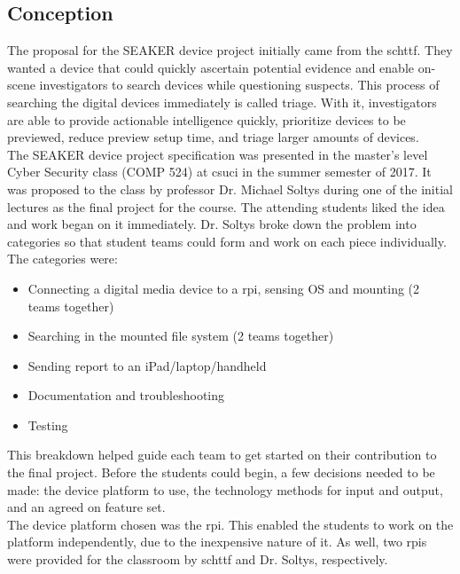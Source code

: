 \documentclass[12pt]{article}
\begin{document}
\subsection{Conception}

The proposal for the SEAKER device project initially came from the \gls{schttf}.  They wanted
a device that could quickly ascertain potential evidence and enable on-scene investigators
to search devices while questioning suspects.  This process of searching the digital devices
immediately is called triage.  With it, investigators are able to provide actionable
intelligence quickly, prioritize devices to be previewed, reduce preview setup time, and
triage larger amounts of devices.\\

The SEAKER device project specification was presented in the master's level Cyber
Security class (COMP 524) at \gls{csuci} in the summer semester of 2017.  It was
proposed to the class by professor Dr. Michael Soltys during one of the initial
lectures as the final project for the course.  The attending students liked the idea
and work began on it immediately.
Dr. Soltys broke down the problem into categories so that student teams could form and
work on each piece individually.  The categories were:

\vspace{0.5 cm}
\begin{itemize}
  \item Connecting a digital media device to a \gls{rpi}, sensing OS and mounting (2 teams together)
  \item Searching in the mounted file system (2 teams together)
  \item Sending report to an iPad/laptop/handheld
  \item Documentation and troubleshooting
  \item Testing
\end{itemize}
\vspace{0.5 cm}

This breakdown helped guide each team to get started on their contribution to the
final project.  Before the students could begin, a few decisions needed to be made:
the device platform to use, the technology methods for input and output, and an
agreed on feature set.\\

The device platform chosen was the \gls{rpi}.  This enabled the students to work on the platform
independently, due to the inexpensive nature of it.  As well, two \glspl{rpi} were provided
for the classroom by \gls{schttf} and Dr. Soltys, respectively.\\
\end{document}

